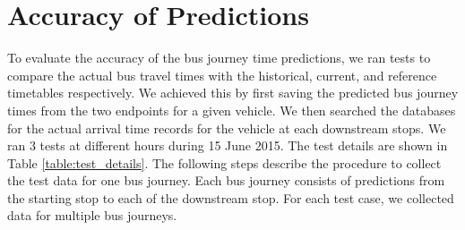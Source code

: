 \section{Accuracy of Predictions}
\label{sec:prediction_accuracy}
\par To evaluate the accuracy of the bus journey time predictions, we ran tests to compare the actual bus travel times with the historical, current, and reference timetables respectively. We achieved this by first saving the predicted bus journey times from the two endpoints for a given vehicle. We then searched the databases for the actual arrival time records for the vehicle at each downstream stops. We ran 3 tests at different hours during 15 June 2015. The test details are shown in Table \ref{table:test_details}. The following steps describe the procedure to collect the test data for one bus journey. Each bus journey consists of predictions from the starting stop to each of the downstream stop. For each test case, we collected data for multiple bus journeys.

